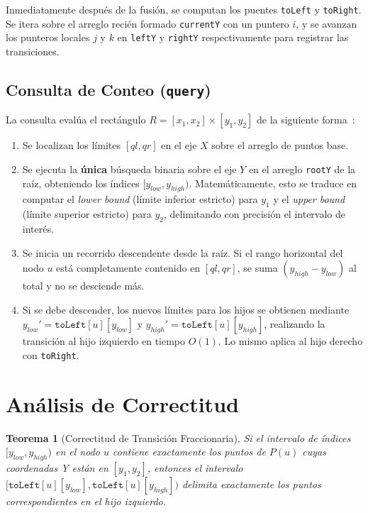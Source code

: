 \documentclass[10pt,twocolumn,a4paper]{article}
\newtheorem{theorem}{Teorema}
\begin{document}
Inmediatamente después de la fusión, se computan los puentes \texttt{toLeft} y \texttt{toRight}. Se itera sobre el arreglo recién formado \texttt{currentY} con un puntero $i$, y se avanzan los punteros locales $j$ y $k$ en \texttt{leftY} y \texttt{rightY} respectivamente para registrar las transiciones.

\subsection{Consulta de Conteo (\texttt{query})}
La consulta evalúa el rectángulo $R = [x_1, x_2] \times [y_1, y_2]$ de la siguiente forma~\cite{doc}:
\begin{enumerate}[leftmargin=*]
    \item Se localizan los límites $[ql, qr]$ en el eje $X$ sobre el arreglo de puntos base.
    \item Se ejecuta la \textbf{única} búsqueda binaria sobre el eje $Y$ en el arreglo \texttt{rootY} de la raíz, obteniendo los índices $[y_{low}, y_{high})$. Matemáticamente, esto se traduce en computar el \textit{lower bound} (límite inferior estricto) para $y_1$ y el \textit{upper bound} (límite superior estricto) para $y_2$, delimitando con precisión el intervalo de interés.
    \item Se inicia un recorrido descendente desde la raíz. Si el rango horizontal del nodo $u$ está completamente contenido en $[ql, qr]$, se suma $(y_{high} - y_{low})$ al total y no se desciende más.
    \item Si se debe descender, los nuevos límites para los hijos se obtienen mediante $y_{low}' = \texttt{toLeft}[u][y_{low}]$ y $y_{high}' = \texttt{toLeft}[u][y_{high}]$, realizando la transición al hijo izquierdo en tiempo $O(1)$. Lo mismo aplica al hijo derecho con \texttt{toRight}.
\end{enumerate}

\section{Análisis de Correctitud}

\begin{theorem}[Correctitud de Transición Fraccionaria]
Si el intervalo de índices $[y_{low}, y_{high})$ en el nodo $u$ contiene exactamente los puntos de $P(u)$ cuyas coordenadas Y están en $[y_1, y_2]$, entonces el intervalo $[\texttt{toLeft}[u][y_{low}], \texttt{toLeft}[u][y_{high}])$ delimita exactamente los puntos correspondientes en el hijo izquierdo.
\end{theorem}
\end{document}
